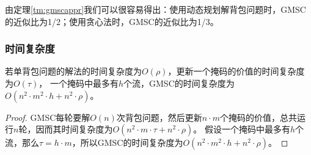 由定理\ref{tm:gmscappr}我们可以很容易得出：使用动态规划解背包问题时，GMSC的近似比为1/2；使用贪心法时，GMSC的近似比为1/3。

\subsubsection{时间复杂度}

\begin{theorem}\label{tm:gmsctime}
若单背包问题的解法的时间复杂度为$O(\rho)$，更新一个掩码的价值的时间复杂度为$O(\tau)$，
一个掩码中最多有$h$个流，GMSC的时间复杂度为$O(n^2\cdot m^2 \cdot h+ n^2 \cdot \rho)$。
\end{theorem}

\begin{proof}
    GMSC每轮要解$O(n)$次背包问题，然后更新$n\cdot m$个掩码的价值，总共运行$n$轮，因而其时间复杂度为$O(n^2\cdot m \cdot \tau + n^2 \cdot \rho)$。
    假设一个掩码中最多有$h$个流，那么$\tau = h\cdot m$，所以GMSC的时间复杂度为$O(n^2\cdot m^2 \cdot h+ n^2 \cdot \rho)$。
\end{proof}